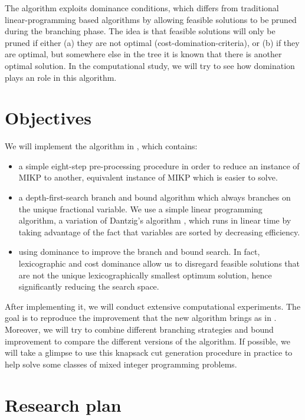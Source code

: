 \documentclass[a4paper,10pt]{article}
\begin{document}
The algorithm exploits dominance conditions, which differs from traditional linear-programming based algorithms by allowing feasible solutions to be pruned during the branching phase. The idea is that feasible solutions will only be pruned if either (a) they are not optimal (cost-domination-criteria), or (b) if they are optimal, but somewhere else in the tree it is known that there is another optimal solution. In the computational study, we will try to see how  domination plays an role in this algorithm.


\section{Objectives}
We will implement the algorithm in \cite{fukasawa2011exact}, which contains:
\begin{itemize}
\item a simple eight-step pre-processing procedure in order to reduce an instance of MIKP to another, equivalent
instance of MIKP which is easier to solve.
\item a depth-first-search branch and bound algorithm which always branches on the unique fractional variable. We use a simple linear programming algorithm, a variation of Dantzig’s algorithm \cite{dantzig1957discrete}, which runs in linear time by taking advantage of the fact that variables are sorted by decreasing efficiency.
\item using dominance to improve the branch and bound search. In fact, lexicographic and cost dominance allow us to disregard feasible solutions that are not the unique lexicographically smallest optimum solution, hence significantly reducing the search space.
\end{itemize}
After implementing it, we will conduct extensive computational experiments. The goal is to reproduce the improvement that the new algorithm brings as in \cite{fukasawa2011exact}. Moreover, we will try to combine different branching strategies and bound improvement to compare the different versions of the algorithm. If possible, we will take a glimpse to use this knapsack cut generation procedure in practice to help solve some classes of mixed integer programming problems.


\section{Research plan}

 


 
\end{document}
